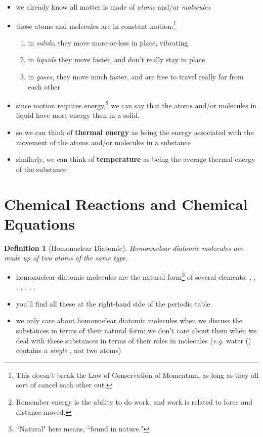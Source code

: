 \documentclass[11pt, oneside]{article}   	%
\newtheorem{definition}{Definition}
\begin{document}
\begin{itemize}
\item we already know all matter is made of \emph{atoms} and/or \emph{molecules}
\item those atoms and molecules are in constant motion:\footnote{This doesn't break the Law of Conservation of Momentum, as long as they all sort of cancel each other out.}
\begin{enumerate}
\item in \emph{solids}, they move more-or-less in place, vibrating
\item in \emph{liquids} they move faster, and don't really stay in place
\item in \emph{gases}, they move much faster, and are free to travel really far from each other
\end{enumerate}
\item since motion requires energy,\footnote{Remember energy is the ability to do work, and work is related to force and distance moved.} we can say that the atoms and/or molecules in liquid have more energy than in a solid.
\item so we can think of \textbf{thermal energy} as being the energy associated with the movement of the atoms and/or molecules in a substance
\item similarly, we can think of \textbf{temperature} as being the average thermal energy of the substance
\end{itemize}


\section{Chemical Reactions and Chemical Equations}
\begin{definition}[Homonuclear Diatomic]\label{defn:homonuclear-diatomic}
Homonuclear diatomic molecules are made up of two atoms of the same type.
\end{definition}

\begin{itemize}
\item homonuclear diatomic molecules are the natural form\footnote{``Natural" here means, ``found in nature."} of several elements: , , , , , , , 
\item you'll find all these at the right-hand side of the periodic table
\item we only care about homonuclear diatomic molecules when we discuss the substances in terms of their natural form: we don't care about them when we deal with these substances in terms of their roles in molecules (\emph{e.g.} water () contains a \emph{single} , not two  atoms)
\end{itemize}
\end{document}

